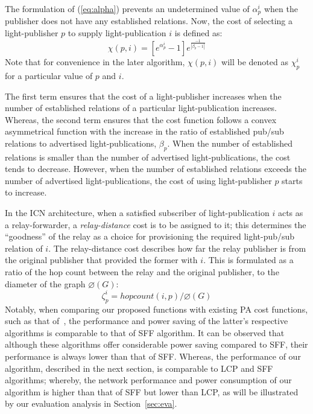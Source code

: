 \documentclass[journal]{IEEEtran}
\begin{document}
The formulation of (\ref{eq:alpha}) prevents an undetermined value of $\alpha_p^i$ when the publisher does not have any established relations. Now, the cost of selecting a light-publisher $p$ to supply light-publication $i$ is defined as:
\begin{equation}\label{pcost}
\chi(p,i) = [e^{\alpha_p^i} -1]  e ^{\frac{-1}{|\beta_p -1|}}
\end{equation}
Note that for convenience in the later algorithm, $\chi(p, i)$ will be denoted as $\chi^i_p$ for a particular value of $p$ and $i$.

The first term ensures that the cost of a light-publisher increases when the number of established relations of a particular light-publication increases. Whereas, the second term ensures that the cost function follows a convex asymmetrical function with the increase in the ratio of established pub/sub relations to advertised light-publications, $\beta_p$. When the number of established relations is smaller than the number of advertised light-publications, the cost tends to decrease. However, when the number of established relations exceeds the number of advertised light-publications, the cost of using light-publisher $p$ starts to increase.

In the ICN architecture, when a satisfied subscriber of
light-publication $i$ acts as a relay-forwarder, a
\emph{relay-distance} cost is to be assigned to it; this determines
the ``goodness'' of the relay as a choice for provisioning the
required light-pub/sub relation of $i$. The relay-distance cost
describes how far the relay publisher is from the original publisher that provided the former with $i$. This is formulated as a ratio of the hop count between the relay and the original publisher, to the diameter of the graph $\diameter(G)$:
\begin{equation}
\zeta_p^i = hopcount(i,p)/\diameter(G)\label{rcost}
\end{equation}
 Notably, when comparing our proposed functions with existing PA cost functions, such as that of~\cite{coi:alloptic, wia:alloptic}, the performance and power saving of the latter's respective algorithms is comparable to that of SFF algorithm. It can be observed that although these algorithms offer considerable power saving compared to SFF, their performance is always lower than that of SFF. Whereas, the performance of our algorithm, described in the next section, is comparable to LCP and SFF algorithms; whereby, the network performance and power consumption of our algorithm is higher than that of SFF but lower than LCP, as will be illustrated by our evaluation analysis in Section~\ref{sec:eva}.
\end{document}
